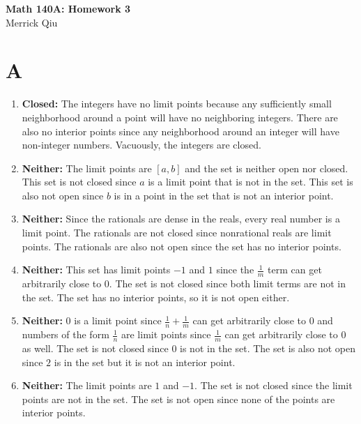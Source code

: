 \documentclass{article}
\begin{document}
\begin{center}
	\huge{\bf Math 140A: Homework 3} \\
	Merrick Qiu
\end{center}
\section*{A}
\begin{enumerate}
    \item \textbf{Closed: }The integers have no limit points because
    any sufficiently small neighborhood around a point 
    will have no neighboring integers.
    There are also no interior points since any neighborhood around 
    an integer will have non-integer numbers.
    Vacuously, the integers are closed.
    \item \textbf{Neither: }The limit points are $[a,b]$ and the set is neither open nor closed.
    This set is not closed since $a$ is a limit point
    that is not in the set.
    This set is also not open since $b$ is in a point in the set 
    that is not an interior point.
    \item \textbf{Neither: } Since the rationals are dense in the reals,
    every real number is a limit point.
    The rationals are not closed since nonrational reals 
    are limit points.
    The rationals are also not open since the set has no interior points.
    \item \textbf{Neither: } This set has limit points $-1$ and $1$ since the 
    $\frac{1}{m}$ term can get arbitrarily close to 0.
    The set is not closed since both limit terms are not in the set.
    The set has no interior points, so it is not open either.
    \item \textbf{Neither: }$0$ is a limit point since $\frac{1}{n} + \frac{1}{m}$
    can get arbitrarily close to $0$ and numbers of the form $\frac{1}{n}$
    are limit points since $\frac{1}{m}$ can get arbitrarily close to 0 as well.
    The set is not closed since $0$ is not in the set.
    The set is also not open since $2$ is in the set but it is not an interior point.
    \item \textbf{Neither: } The limit points are $1$ and $-1$.
    The set is not closed since the limit points are not in the set.
    The set is not open since none of the points are interior points.
\end{enumerate}
\newpage 
\end{document}
